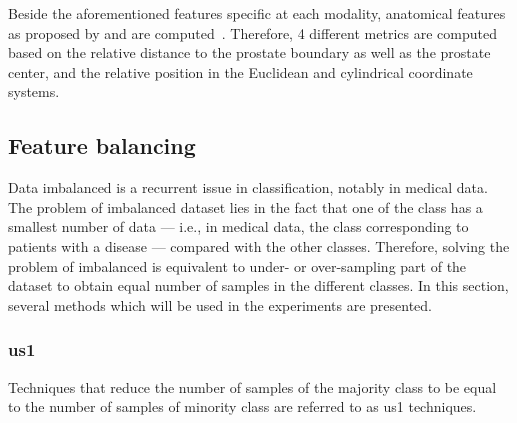 Beside the aforementioned features specific at each modality, anatomical features as proposed by \citeauthor{Chen2002} and \citeauthor{Litjens2014} are computed~\cite{Chen2002,Litjens2014}.
Therefore, 4 different metrics are computed based on the relative distance to the prostate boundary as well as the prostate center, and the relative position in the Euclidean and cylindrical coordinate systems.

\subsection{Feature balancing}\label{subsec:chp6:method:fea-bal}
Data imbalanced is a recurrent issue in classification, notably in medical data.
The problem of imbalanced dataset lies in the fact that one of the class has a smallest number of data --- i.e., in medical data, the class corresponding to patients with a disease --- compared with the other classes.
Therefore, solving the problem of imbalanced is equivalent to under- or over-sampling part of the dataset to obtain equal number of samples in the different classes.
In this section, several methods which will be used in the experiments are presented.

\subsubsection{\Acl*{us1}}
Techniques that reduce the number of samples of the majority class to be equal to the number of samples of minority class are referred to as \ac{us1} techniques.


